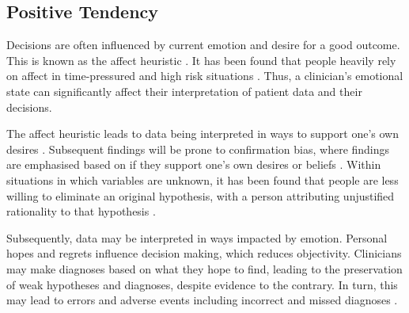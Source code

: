 \documentclass{chi-ext}
\begin{document}
\subsection{Positive Tendency}
  Decisions are often influenced by current emotion and desire for a good outcome. This is known as the affect heuristic \cite{Kahneman2012}.  It has been found that people heavily rely on affect in time-pressured and high risk situations \cite{Finucane1998}. Thus, a clinician's emotional state can significantly affect their interpretation of patient data and their decisions. 

  The affect heuristic leads to data being interpreted in ways to support one's own desires \cite{Nickerson1998}. Subsequent findings will be prone to confirmation bias, where findings are emphasised based on if they support one's own desires or beliefs \cite{Kahneman2012}. Within situations in which variables are unknown, it has been found that people are less willing to eliminate an original hypothesis, with a person attributing unjustified rationality to that hypothesis \cite{Wason1960}.
  
  Subsequently, data may be interpreted in ways impacted by emotion. Personal hopes and regrets influence decision making, which reduces objectivity. Clinicians may make diagnoses based on what they hope to find, leading to the preservation of weak hypotheses and diagnoses, despite evidence to the contrary. In turn, this may lead to errors and adverse events including incorrect and missed diagnoses \cite{Croskerry2002}.


\end{document}
